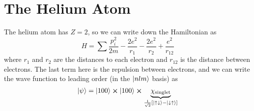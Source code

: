 \documentclass[a4paper,twoside,master.tex]{subfiles}
\begin{document}

\section{The Helium Atom}
\label{sec:the_helium_atom}

The helium atom has $ Z = 2 $, so we can write down the Hamiltonian as
\begin{equation}
    H = \sum \frac{p_i^2}{2m} - \frac{2e^2}{r_1} - \frac{2 e^2}{r_2} + \frac{e^2}{r_{12}}
\end{equation}
where $ r_1 $ and $ r_2 $ are the distances to each electron and $ r_{12} $ is the distance between electrons. The last term here is the repulsion between electrons, and we can write the wave function to leading order (in the $\ket{nlm} $ basis) as
\begin{equation}
    \ket{\psi} =\ket{100} \cross\ket{100} \cross \underbrace{\chi_{\text{singlet}}}_{\frac{1}{\sqrt{2}} \left[\ket{\uparrow\downarrow} -\ket{\downarrow\uparrow} \right]}
\end{equation}
\end{document}
